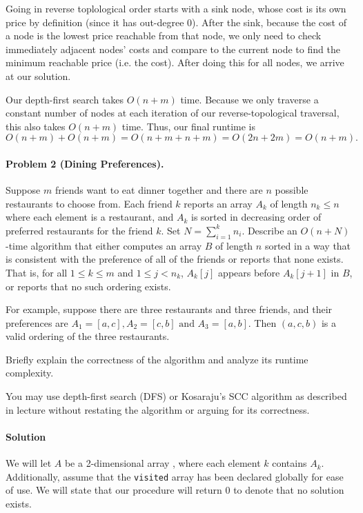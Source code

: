 \documentclass[11pt]{article}
\begin{document}
Going in reverse toplological order starts with a sink node, whose cost is its
own price by definition (since it has out-degree 0). After the sink, because the
cost of a node is the lowest price reachable from that node, we only need to
check immediately adjacent nodes' costs and compare to the current node to find
the minimum reachable price (i.e. the cost). After doing this for all nodes,
we arrive at our solution.

Our depth-first search takes $O(n+m)$ time. Because we only traverse a constant
number of nodes at each iteration of our reverse-topological traversal, this
also takes $O(n+m)$ time. Thus, our final runtime is
\[
    O(n+m) + O(n+m) = O(n+m+n+m) = O(2n + 2m) = \boxed{O(n+m)}.
\]


\newpage
\paragraph{Problem 2 (Dining Preferences).} Suppose $m$ friends want to eat dinner together and there are $n$ possible restaurants to choose from. Each friend $k$ reports an array $A_k$ of length $n_k \leq n$ where each element is a restaurant, and $A_k$ is sorted in decreasing order of preferred restaurants for the friend $k$. Set $N = \sum_{i=1}^k n_i$. Describe an $O(n+N)$-time algorithm that either computes an array $B$ of length $n$ sorted in a way that is consistent with the preference of all of the friends or reports that none exists. That is, 
for all $1\le k \le m$ and $1 \le j < n_k$, $A_k[j]$ appears before $A_k[j+1]$ in $B$, or reports that no such ordering exists. 

For example, suppose there are three restaurants and three friends, and their preferences are $A_1 = [a,c], A_2 = [c,b] \text{ and } A_3 = [a,b]$. Then $(a,c,b)$ is a valid ordering of the three restaurants.

Briefly explain the correctness of the algorithm and analyze its runtime complexity.

You may use depth-first search (DFS) or Kosaraju's SCC algorithm as described in lecture without restating the algorithm or arguing for its correctness.

\paragraph{Solution}
We will let $A$ be a 2-dimensional array , where each element $k$ contains
$A_{k}$. Additionally, assume that the \texttt{visited} array has been declared
globally for ease of use. We will state that our  procedure
will return 0 to denote that no solution exists.
\end{document}
